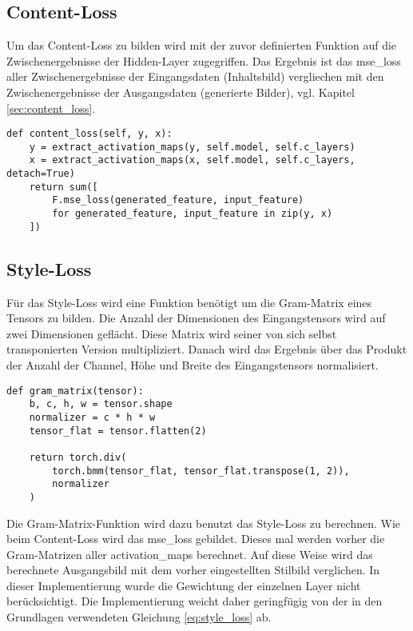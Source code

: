 \subsection{Content-Loss}

Um das Content-Loss zu bilden wird mit der zuvor definierten Funktion auf die Zwischenergebnisse der Hidden-Layer zugegriffen.
Das Ergebnis ist das \gls{mse_loss} aller Zwischenergebnisse der Eingangsdaten (Inhaltsbild) vergliechen mit den Zwischenergebnisse der Ausgangsdaten (generierte Bilder), vgl. Kapitel \ref{sec:content_loss}.

\begin{listing}[H]
\begin{verbatim}
def content_loss(self, y, x):
    y = extract_activation_maps(y, self.model, self.c_layers)
    x = extract_activation_maps(x, self.model, self.c_layers, detach=True)
    return sum([
        F.mse_loss(generated_feature, input_feature)
        for generated_feature, input_feature in zip(y, x)
    ])
\end{verbatim}
\end{listing}

\subsection{Style-Loss}

Für das Style-Loss wird eine Funktion benötigt um die Gram-Matrix eines Tensors zu bilden. Die Anzahl der Dimensionen des Eingangstensors wird auf zwei Dimensionen geflächt. Diese Matrix wird seiner von sich selbst transponierten Version multipliziert. Danach wird das Ergebnis über das Produkt der Anzahl der Channel, Höhe und Breite des Eingangstensors normalisiert.

\begin{listing}[H]
\begin{verbatim}
def gram_matrix(tensor):
    b, c, h, w = tensor.shape
    normalizer = c * h * w
    tensor_flat = tensor.flatten(2)

    return torch.div(
        torch.bmm(tensor_flat, tensor_flat.transpose(1, 2)),
        normalizer
    )
\end{verbatim}
\end{listing}

Die Gram-Matrix-Funktion wird dazu benutzt das Style-Loss zu berechnen. Wie beim Content-Loss wird das \gls{mse_loss} gebildet. Dieses mal werden vorher die Gram-Matrizen aller \gls{activation_map}s berechnet. Auf diese Weise wird das berechnete Ausgangsbild mit dem vorher eingestellten Stilbild verglichen.
In dieser Implementierung wurde die Gewichtung der einzelnen Layer nicht berücksichtigt. Die Implementierung weicht daher geringfügig von der in den Grundlagen verwendeten Gleichung \eqref{eq:style_loss} ab.

